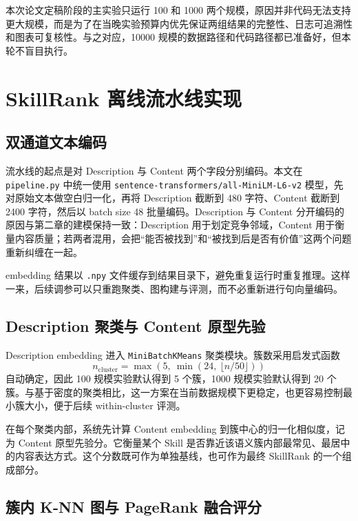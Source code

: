 本次论文定稿阶段的主实验只运行 100 和 1000 两个规模，原因并非代码无法支持更大规模，而是为了在当晚实验预算内优先保证两组结果的完整性、日志可追溯性和图表可复核性。与之对应，10000 规模的数据路径和代码路径都已准备好，但本轮不盲目执行。

\section{SkillRank 离线流水线实现}
\label{sec:skillrank_impl}

\subsection{双通道文本编码}

流水线的起点是对 Description 与 Content 两个字段分别编码。本文在 \texttt{pipeline.py} 中统一使用 \texttt{sentence-transformers/all-MiniLM-L6-v2} 模型，先对原始文本做空白归一化，再将 Description 截断到 480 字符、Content 截断到 2400 字符，然后以 batch size 48 批量编码。Description 与 Content 分开编码的原因与第二章的建模保持一致：Description 用于划定竞争邻域，Content 用于衡量内容质量；若两者混用，会把“能否被找到”和“被找到后是否有价值”这两个问题重新纠缠在一起。

embedding 结果以 \texttt{.npy} 文件缓存到结果目录下，避免重复运行时重复推理。这样一来，后续调参可以只重跑聚类、图构建与评测，而不必重新进行句向量编码。

\subsection{Description 聚类与 Content 原型先验}

Description embedding 进入 \texttt{MiniBatchKMeans} 聚类模块。簇数采用启发式函数
\[
n_{\text{cluster}} = \max(5,\ \min(24,\ \lfloor n/50 \rfloor))
\]
自动确定，因此 100 规模实验默认得到 5 个簇，1000 规模实验默认得到 20 个簇。与基于密度的聚类相比，这一方案在当前数据规模下更稳定，也更容易控制最小簇大小，便于后续 within-cluster 评测。

在每个聚类内部，系统先计算 Content embedding 到簇中心的归一化相似度，记为 Content 原型先验分。它衡量某个 Skill 是否靠近该语义簇内部最常见、最居中的内容表达方式。这个分数既可作为单独基线，也可作为最终 SkillRank 的一个组成部分。

\subsection{簇内 K-NN 图与 PageRank 融合评分}

